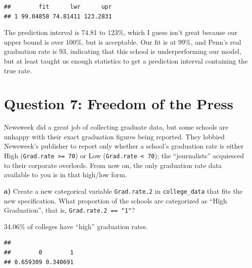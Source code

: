 \documentclass[]{article}
\newenvironment{Shaded}{\begin{snugshade}}{\end{snugshade}}
\newcommand{\KeywordTok}[1]{\textcolor[rgb]{0.13,0.29,0.53}{\textbf{#1}}}
\newcommand{\DataTypeTok}[1]{\textcolor[rgb]{0.13,0.29,0.53}{#1}}
\newcommand{\DecValTok}[1]{\textcolor[rgb]{0.00,0.00,0.81}{#1}}
\newcommand{\StringTok}[1]{\textcolor[rgb]{0.31,0.60,0.02}{#1}}
\newcommand{\OperatorTok}[1]{\textcolor[rgb]{0.81,0.36,0.00}{\textbf{#1}}}
\newcommand{\NormalTok}[1]{#1}
\begin{document}
\begin{verbatim}
##        fit      lwr      upr
## 1 99.04858 74.81411 123.2831
\end{verbatim}

The prediction interval is 74.81 to 123\%, which I guess isn't great
because our upper bound is over 100\%, but is acceptable. Our fit is at
99\%, and Penn's real graduation rate is 93, indicating that this school
is underperforming our model, but at least taught us enough statistics
to get a prediction interval containing the true rate.

\section{Question 7: Freedom of the
Press}\label{question-7-freedom-of-the-press}

Newsweek did a great job of collecting graduate data, but some schools
are unhappy with their exact graduation figures being reported. They
lobbied Newsweek's publisher to report only whether a school's
graduation rate is either High (\texttt{Grad.rate\ \textgreater{}=\ 70})
or Low (\texttt{Grad.rate\ \textless{}\ 70}); the ``journalists''
acquiesced to their corporate overlords. From now on, the only
graduation rate data available to you is in that high/low form.

\textbf{a)} Create a new categorical variable \texttt{Grad.rate.2} in
\texttt{college\_data} that fits the new specification. What proportion
of the schools are categorized as ``High Graduation'', that is,
\texttt{Grad.rate.2\ ==\ "1"}?

34.06\% of colleges have ``high'' graduation rates.

\begin{Shaded}
\end{Shaded}

\begin{verbatim}
## 
##        0        1 
## 0.659309 0.340691
\end{verbatim}
\end{document}
